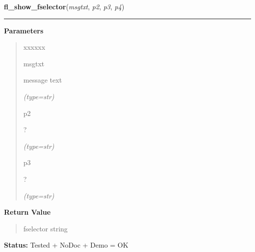 \hspace{.8\funcindent}\begin{boxedminipage}{\funcwidth}

    \raggedright \textbf{fl\_show\_fselector}(\textit{msgtxt}, \textit{p2}, \textit{p3}, \textit{p4})

    \vspace{-1.5ex}

    \rule{\textwidth}{0.5\fboxrule}
\setlength{\parskip}{2ex}
\setlength{\parskip}{1ex}
      \textbf{Parameters}
      \vspace{-1ex}

      \begin{quote}
        \begin{Ventry}{xxxxxx}

          \item[msgtxt]

          message text

            {\it (type=str)}

          \item[p2]

          ?

            {\it (type=str)}

          \item[p3]

          ?

            {\it (type=str)}

        \end{Ventry}

      \end{quote}

      \textbf{Return Value}
    \vspace{-1ex}

      \begin{quote}
      fselector string

      \end{quote}

\textbf{Status:} Tested + NoDoc + Demo = OK



    \end{boxedminipage}

    \label{xformslib:flgoodies:fl_show_fselector}

    \vspace{0.5ex}


